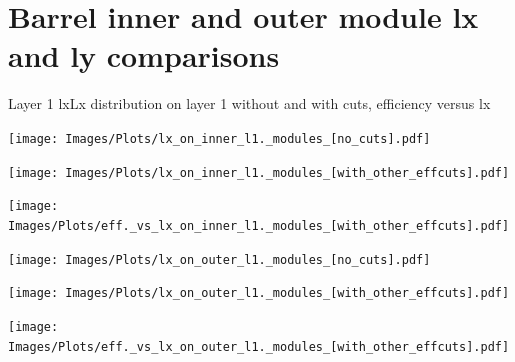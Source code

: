 \documentclass{beamer}
\begin{document}
\section{Barrel inner and outer module lx and ly comparisons} 

\begin{frame}{Layer 1 lx}{Lx distribution on layer 1 without and with cuts, efficiency versus lx}
\begin{minipage}{0.32\textwidth}
  \centering
  \texttt{[image: Images/Plots/lx\_on\_inner\_l1.\_modules\_[no\_cuts].pdf]}
\end{minipage}%
\hspace{0.01\textwidth}%
\begin{minipage}{0.32\textwidth}
  \centering
  \texttt{[image: Images/Plots/lx\_on\_inner\_l1.\_modules\_[with\_other\_effcuts].pdf]}
\end{minipage}%
\hspace{0.01\textwidth}%
\begin{minipage}{0.32\textwidth}
  \centering
  \texttt{[image: Images/Plots/eff.\_vs\_lx\_on\_inner\_l1.\_modules\_[with\_other\_effcuts].pdf]}
\end{minipage}
\begin{minipage}{0.32\textwidth}
  \centering
  \texttt{[image: Images/Plots/lx\_on\_outer\_l1.\_modules\_[no\_cuts].pdf]}
\end{minipage}%
\hspace{0.01\textwidth}%
\begin{minipage}{0.32\textwidth}
  \centering
  \texttt{[image: Images/Plots/lx\_on\_outer\_l1.\_modules\_[with\_other\_effcuts].pdf]}
\end{minipage}%
\hspace{0.01\textwidth}%
\begin{minipage}{0.32\textwidth}
  \centering
  \texttt{[image: Images/Plots/eff.\_vs\_lx\_on\_outer\_l1.\_modules\_[with\_other\_effcuts].pdf]}
\end{minipage}
\end{frame}
\end{document}
